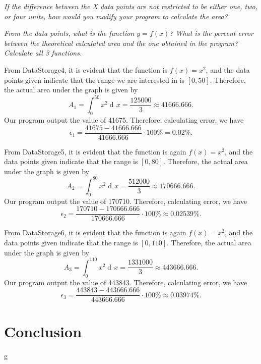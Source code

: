 \documentclass[10pt, letterpaper, titlepage]{article} %
\DeclareMathOperator{\di}{d\!} %
\begin{document}
\begin{multicols*}{2}
\textit{If the difference between the X data points are not restricted to be either one, two, or four units, how would you modify your program to calculate the area?}

\textit{From the data points, what is the function $y = f(x)$? What is the percent error between the theoretical calculated area and the one obtained in the program? Calculate all 3 functions.}

From DataStorage4, it is evident that the function is $f(x) = x^2$, and the data points given indicate that the range we are interested in is $[0, 50]$. Therefore, the actual area under the graph is given by
\begin{equation}
	A_1 = \int_0^{50} x^2 \di x = \dfrac{125000}{3} \approx 41666.666.
\end{equation} 
Our program output the value of 41675. Therefore, calculating error, we have
\begin{equation}
	\epsilon_1 = \dfrac{41675 - 41666.666}{41666.666} \cdot 100\% = 0.02\%. 
\end{equation}

From DataStorage5, it is evident that the function is again $f(x) = x^2$, and the data points given indicate that the range is $[0, 80]$. Therefore, the actual area under the graph is given by
\begin{equation}
	A_2 = \int_0^{80} x^2 \di x = \dfrac{512000}{3} \approx 170666.666.
\end{equation} 
Our program output the value of 170710. Therefore, calculating error, we have
\begin{equation}
	\epsilon_2 = \dfrac{170710 - 170666.666}{170666.666} \cdot 100\% \approx 0.02539\%. 
\end{equation}

From DataStorage6, it is evident that the function is again $f(x) = x^2$, and the data points given indicate that the range is $[0, 110]$. Therefore, the actual area under the graph is given by
\begin{equation}
	A_3 = \int_0^{110} x^2 \di x = \dfrac{1331000}{3} \approx 443666.666.
\end{equation} 
Our program output the value of 443843. Therefore, calculating error, we have
\begin{equation}
	\epsilon_3 = \dfrac{443843 - 443666.666}{443666.666} \cdot 100\% \approx 0.03974\%. 
\end{equation}

\section{Conclusion}
g


\end{multicols*}
\end{document}
